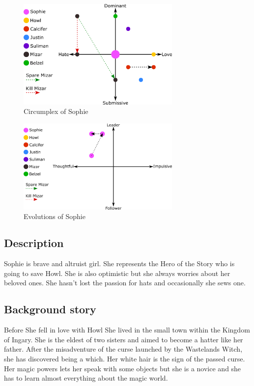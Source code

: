 \begin{figure}[H]
  \centering
  \includegraphics[width=8cm]{Images/Circumplexes/sophieCircumplex}
  \caption{Circumplex of Sophie}
\end{figure}

\begin{figure}[H]
  \centering
  \includegraphics[width=8cm]{Images/Evolutions/sophieEvolution}
  \caption{Evolutions of Sophie}
\end{figure}

\subsection{Description}
Sophie is brave and altruist girl. She represents the Hero of the Story who is going to save Howl. She is also optimistic but she always worries about her beloved ones. She hasn’t lost the passion for hats and occasionally she sews one.

\subsection{Background story}
Before She fell in love with Howl She lived in the small town within the Kingdom of Ingary. She is the eldest of two sisters and aimed to become a hatter like her father. After the misadventure of the curse launched by the Wastelands Witch, she has discovered being a which. Her white hair is the sign of the passed curse. Her magic powers lets her speak with some objects but she is a novice and she has to learn almost everything about the magic world.
